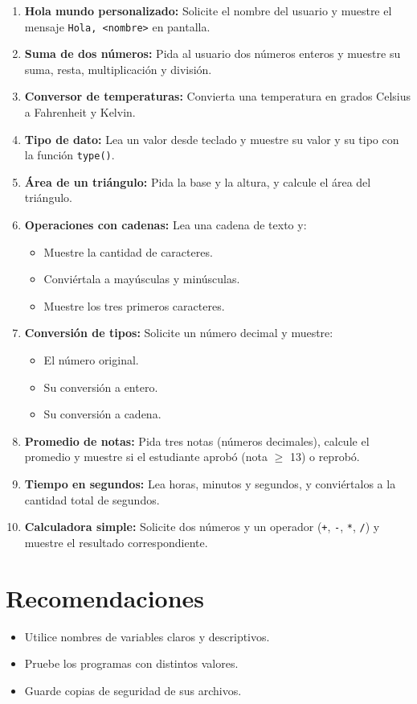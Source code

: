 \documentclass[12pt,a4paper]{article}
\begin{document}
\begin{enumerate}[label=\textbf{Ejercicio \arabic*:}, leftmargin=1.5cm]
    \item \textbf{Hola mundo personalizado:} Solicite el nombre del usuario y muestre el mensaje \texttt{Hola, <nombre>} en pantalla.
    
    \item \textbf{Suma de dos números:} Pida al usuario dos números enteros y muestre su suma, resta, multiplicación y división.
    
    \item \textbf{Conversor de temperaturas:} Convierta una temperatura en grados Celsius a Fahrenheit y Kelvin.
    
    \item \textbf{Tipo de dato:} Lea un valor desde teclado y muestre su valor y su tipo con la función \texttt{type()}.
    
    \item \textbf{Área de un triángulo:} Pida la base y la altura, y calcule el área del triángulo.
    
    \item \textbf{Operaciones con cadenas:} Lea una cadena de texto y:
    \begin{itemize}
        \item Muestre la cantidad de caracteres.
        \item Conviértala a mayúsculas y minúsculas.
        \item Muestre los tres primeros caracteres.
    \end{itemize}
    
    \item \textbf{Conversión de tipos:} Solicite un número decimal y muestre:
    \begin{itemize}
        \item El número original.
        \item Su conversión a entero.
        \item Su conversión a cadena.
    \end{itemize}
    
    \item \textbf{Promedio de notas:} Pida tres notas (números decimales), calcule el promedio y muestre si el estudiante aprobó (nota $\geq$ 13) o reprobó.
    
    \item \textbf{Tiempo en segundos:} Lea horas, minutos y segundos, y conviértalos a la cantidad total de segundos.
    
    \item \textbf{Calculadora simple:} Solicite dos números y un operador (\texttt{+}, \texttt{-}, \texttt{*}, \texttt{/}) y muestre el resultado correspondiente.
\end{enumerate}

\section*{Recomendaciones}
\begin{itemize}
    \item Utilice nombres de variables claros y descriptivos.
    \item Pruebe los programas con distintos valores.
    \item Guarde copias de seguridad de sus archivos.
\end{itemize}
\end{document}
